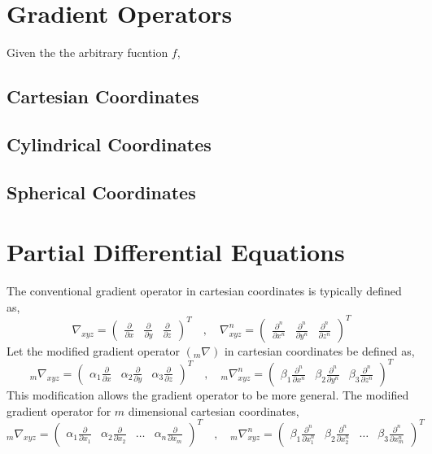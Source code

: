 \documentclass[a4paper, 12pt]{report}
\def\a{\alpha}
\def\be{\beta}
\def\f{\frac}
\def\dst{\displaystyle}
\def\p{\partial}
\let\stdsection\section
\renewcommand\section{\newpage\stdsection}
\begin{document}
\begin{center}
\section{Gradient Operators}
Given the the arbitrary fucntion $f$,
\subsection{Cartesian Coordinates}
\subsection{Cylindrical Coordinates}
\subsection{Spherical Coordinates}
\section{Partial Differential Equations}
\begin{comment}
Partial Differential Equations Header
Currently, only discussions of the Sturm -Liouville, the other applications are placed elsewhere, such as Physics Archives or Fluid Archives
\end{comment}
The conventional gradient operator in cartesian coordinates is typically defined as,
$$\nabla_{xyz} = \begin{pmatrix}\dst{\f{\p}{\p x}} & \dst{\f{\p}{\p y}} & \dst{\f{\p}{\p z}}\end{pmatrix}^T\quad,\quad \nabla^n_{xyz} = \begin{pmatrix}\dst{\f{\p^n}{\p x^n}} & \dst{\f{\p^n}{\p y^n}} & \dst{\f{\p^n}{\p z^n}}\end{pmatrix}^T$$
Let the modified gradient operator $\dst{({}_{m}\nabla)}$ in cartesian coordinates be defined as,
$${}_{m}\nabla_{xyz} = \begin{pmatrix}\dst{\a_1\f{\p}{\p x}} & \dst{\a_2\f{\p}{\p y}} & \dst{\a_3\f{\p}{\p z}}\end{pmatrix}^T\quad,\quad {}_{m}\nabla^n_{xyz} = \begin{pmatrix}\dst{\be_1\f{\p^n}{\p x^n}} & \dst{\be_2\f{\p^n}{\p y^n}} & \dst{\be_3\f{\p^n}{\p z^n}}\end{pmatrix}^T$$
This modification allows the gradient operator to be more general. The modified gradient operator for $m$ dimensional cartesian coordinates,
$${}_{m}\nabla_{xyz} = \begin{pmatrix}\dst{\a_1\f{\p}{\p x_1}} & \dst{\a_2\f{\p}{\p x_2}} & \dots & \dst{\a_n\f{\p}{\p x_m}}\end{pmatrix}^T\quad,\quad {}_{m}\nabla^n_{xyz} = \begin{pmatrix}\dst{\be_1\f{\p^n}{\p x_1^n}} & \dst{\be_2\f{\p^n}{\p x_2^n}} & \dots & \dst{\be_3\f{\p^n}{\p x_m^n}}\end{pmatrix}^T$$

\end{center}
\end{document}
